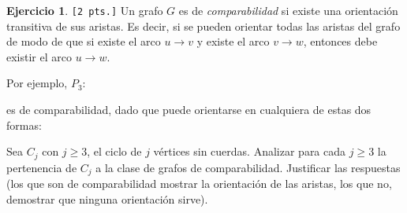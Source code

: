 \documentclass[a4paper,oneside,12pt]{amsart}
\theoremstyle{definition}
\newtheorem{quest}{Ejercicio}
\begin{document}



\begin{quest}\verb|[2 pts.]| 
Un grafo $G$ es de \textit{comparabilidad} si existe una orientación transitiva de sus aristas. Es decir, si se pueden orientar todas las aristas del grafo de modo de que si existe el arco $u\rightarrow v$ y existe el arco $v\rightarrow w$, entonces debe existir el arco $u\rightarrow w$.

Por ejemplo, $P_3$:

\begin{center}
\end{center}

es de comparabilidad, dado que puede orientarse en cualquiera de estas dos formas:

\begin{center}
\end{center}

Sea $C_{j}$ con $j\geq 3$, el ciclo de $j$ vértices sin cuerdas. Analizar para cada $j\geq 3$ la pertenencia de $C_j$ a la clase de grafos de comparabilidad. Justificar las respuestas (los que son de comparabilidad mostrar la orientación de las aristas, los que no, demostrar que ninguna orientación sirve).
\end{quest}


\end{document}
